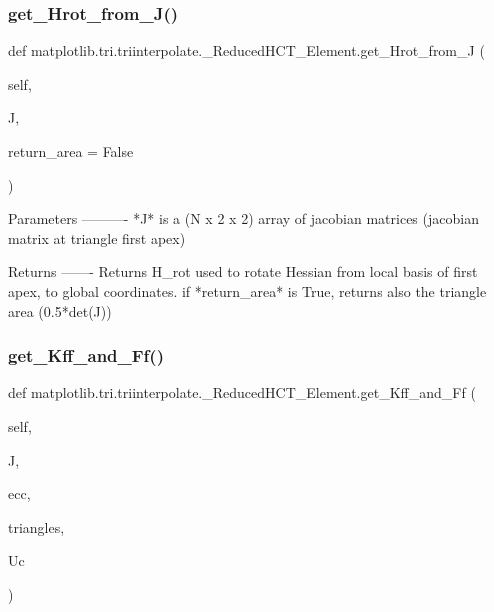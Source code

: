 \subsubsection{\texorpdfstring{get\+\_\+\+Hrot\+\_\+from\+\_\+\+J()}{get\_Hrot\_from\_J()}}
{\footnotesize\ttfamily def matplotlib.\+tri.\+triinterpolate.\+\_\+\+Reduced\+H\+C\+T\+\_\+\+Element.\+get\+\_\+\+Hrot\+\_\+from\+\_\+J (\begin{DoxyParamCaption}\item[{}]{self,  }\item[{}]{J,  }\item[{}]{return\+\_\+area = {\ttfamily False} }\end{DoxyParamCaption})}

\begin{DoxyVerb}Parameters
----------
*J* is a (N x 2 x 2) array of jacobian matrices (jacobian matrix at
triangle first apex)

Returns
-------
Returns H_rot used to rotate Hessian from local basis of first apex,
to global coordinates.
if *return_area* is True, returns also the triangle area (0.5*det(J))
\end{DoxyVerb}
 \mbox{\label{classmatplotlib_1_1tri_1_1triinterpolate_1_1__ReducedHCT__Element_a3b0e4db823a716604d1a9d0dc9b1bc06}} 
\subsubsection{\texorpdfstring{get\+\_\+\+Kff\+\_\+and\+\_\+\+Ff()}{get\_Kff\_and\_Ff()}}
{\footnotesize\ttfamily def matplotlib.\+tri.\+triinterpolate.\+\_\+\+Reduced\+H\+C\+T\+\_\+\+Element.\+get\+\_\+\+Kff\+\_\+and\+\_\+\+Ff (\begin{DoxyParamCaption}\item[{}]{self,  }\item[{}]{J,  }\item[{}]{ecc,  }\item[{}]{triangles,  }\item[{}]{Uc }\end{DoxyParamCaption})}

